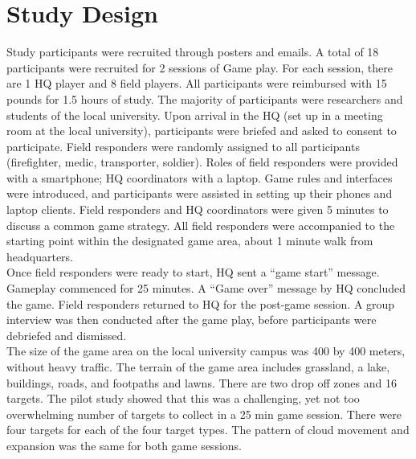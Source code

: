 \section{Study Design}
Study participants were recruited through posters and emails. A total of 18 participants were recruited for 2 sessions of Game play. For each session, there are 1 HQ player and 8 field players. All participants were reimbursed with 15 pounds for 1.5 hours of study. The majority of participants were researchers and students of the local university.  Upon arrival in the HQ (set up in a meeting room at the local university), participants were briefed and asked to consent to participate. Field responders were randomly assigned to all participants (firefighter, medic, transporter, soldier). Roles of field responders were provided with a smartphone; HQ coordinators with a laptop. Game rules and interfaces were introduced, and participants were assisted in setting up their phones and laptop clients. Field responders and HQ coordinators were given 5 minutes to discuss a common game strategy. All field responders were accompanied to the starting point within the designated game area, about 1 minute walk from headquarters.\\

Once field responders were ready to start, HQ sent a ``game start'' message. Gameplay commenced for 25 minutes. A ``Game over'' message by HQ concluded the game. Field responders returned to HQ for the post-game session. A group interview was then conducted after the game play, before participants were debriefed and dismissed.\\

The size of the game area on the local university campus was 400 by 400 meters, without heavy traffic. The terrain of the game area includes grassland, a lake, buildings, roads, and footpaths and lawns. There are two drop off zones and 16 targets. The pilot study showed that this was a challenging, yet not too overwhelming number of targets to collect in a 25 min game session. There were four targets for each of the four target types. The pattern of cloud movement and expansion was the same for both game sessions.\\



